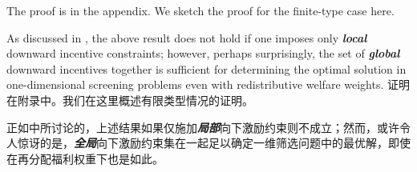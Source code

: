 \documentclass[12pt,letterpaper]{article}
\newenvironment{original}{\color{black}\noindent}{}
\newenvironment{translation}{\color{blue}\noindent}{}
\theoremstyle{plain}
\theoremstyle{definition}
\theoremstyle{remark}
\renewcommand{\1}{\mathds{1}}
\theoremstyle{definition}
\begin{document}
\begin{original}
The proof is in the appendix. We sketch the proof for the finite-type case here.

As discussed in \citet{yang2022costly}, the above result does not hold if one imposes only \textit{\textbf{local}} downward incentive constraints; however, perhaps surprisingly, the set of \textit{\textbf{global}} downward incentives together is sufficient for determining the optimal solution in one-dimensional screening problems even with redistributive welfare weights.
\end{original}
\begin{translation}
证明在附录中。我们在这里概述有限类型情况的证明。

正如\citet{yang2022costly}中所讨论的，上述结果如果仅施加\textit{\textbf{局部}}向下激励约束则不成立；然而，或许令人惊讶的是，\textit{\textbf{全局}}向下激励约束集在一起足以确定一维筛选问题中的最优解，即使在再分配福利权重下也是如此。
\end{translation}
\end{document}
